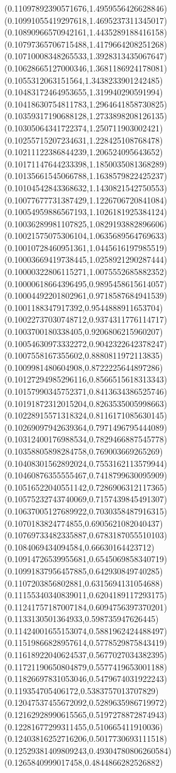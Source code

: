 {(0.11097892390571676,1.4959556426628846)
(0.10991055419297618,1.4695237311345017)
(0.10890966570942161,1.4435289188416158)
(0.10797365706715488,1.4179664208251268)
(0.10710008348265533,1.3928313435067647)
(0.10628665127000346,1.3681186924178081)
(0.1055312063151564,1.3438233901242485)
(0.10483172464953655,1.319940290591994)
(0.10418630754811783,1.2964641858730825)
(0.10359317190688128,1.2733898208126135)
(0.10305064341722374,1.250711903002421)
(0.10255715207234631,1.228425108768478)
(0.10211122386844239,1.206524095643652)
(0.10171147644233398,1.1850035081368289)
(0.10135661545066788,1.1638579822425237)
(0.10104542843368632,1.1430821542750553)
(0.10077677731387429,1.1226706720841084)
(0.10054959886567193,1.1026181925384124)
(0.10036289981107825,1.0829193882896606)
(0.10021575075306104,1.0635689564769633)
(0.10010728460951361,1.0445616197985519)
(0.10003669419738445,1.0258921290287444)
(0.10000322806115271,1.0075552685882352)
(0.10000618664396495,0.9895458615614057)
(0.10004492201802961,0.9718587684941539)
(0.1001188347917392,0.9544888911653704)
(0.10022737030748712,0.9374311776114717)
(0.1003700180338405,0.9206806215960207)
(0.10054630973332272,0.9042322642378247)
(0.1007558167355602,0.8880811972113835)
(0.1009981480604908,0.8722225644897286)
(0.10127294985296116,0.8566515618313343)
(0.10157990345752371,0.8413634386525746)
(0.10191872312015204,0.8263535005998663)
(0.10228915571318324,0.8116171085630145)
(0.10269097942639364,0.7971496795444089)
(0.10312400176988534,0.7829466887545778)
(0.10358805898284758,0.769003669265269)
(0.10408301562892024,0.7553162113579944)
(0.10460876355555467,0.7418799630095909)
(0.10516522040551142,0.7286906312117365)
(0.10575232743740069,0.7157439845491307)
(0.10637005127689922,0.7030358487916315)
(0.1070183824774855,0.6905621082040437)
(0.10769733482335887,0.6783187055510103)
(0.1084069434094584,0.66630164423712)
(0.10914726539955681,0.6545069858340719)
(0.10991837956457885,0.642930849740285)
(0.1107203856802881,0.6315694131054688)
(0.11155340340839011,0.6204189117293175)
(0.11241757187007184,0.6094756397370201)
(0.1133130501364933,0.598735947626445)
(0.11424001655153074,0.5881962424488497)
(0.11519866828957614,0.5778529875843419)
(0.11618922040624537,0.5677027034382395)
(0.11721190650804879,0.5577419653001188)
(0.11826697831053046,0.5479674031922243)
(0.119354705406172,0.5383757013707829)
(0.12047537455672092,0.5289635986719972)
(0.12162928990615565,0.5197278872874943)
(0.12281677299311455,0.510665411910036)
(0.12403816252716206,0.5017730693111518)
(0.12529381409809243,0.49304780806260584)
(0.1265840999017458,0.4844866282526882)
}
